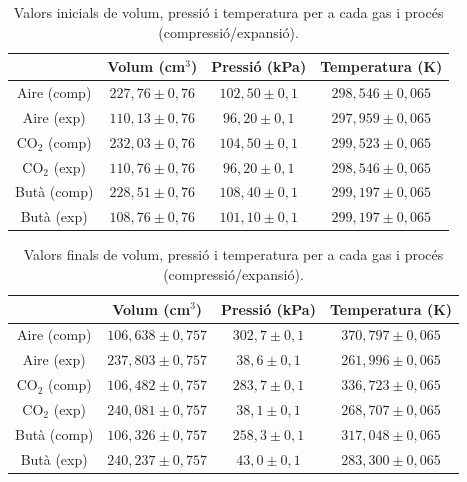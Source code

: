 \documentclass[a4paper,twoside,12pt]{article}
\theoremstyle{definition}
\begin{document}
	 \begin{table}[h]
	 	\centering
	 	\caption{Valors inicials de volum, pressió i temperatura per a cada gas i procés (compressió/expansió).}

	 	\begin{tabular}{|c|ccc|}
	 		\hline
	 		& Volum (cm$^3$) & Pressió (kPa) & Temperatura (K) \\
	 		\hline
	 		Aire (comp) & $227,76 \pm 0,76$ & $102,50 \pm 0,1$ & $298,546 \pm 0,065$ \\
	 		Aire (exp)  & $110,13 \pm 0,76$ & $96,20 \pm 0,1$  & $297,959 \pm 0,065$ \\
	 		\hline
	 		CO$_2$ (comp) & $232,03 \pm 0,76$ & $104,50 \pm 0,1$ & $299,523 \pm 0,065$ \\
	 		CO$_2$ (exp)  & $110,76 \pm 0,76$ & $96,20 \pm 0,1$  & $298,546 \pm 0,065$ \\
	 		\hline
	 		Butà (comp) & $228,51 \pm 0,76$ & $108,40 \pm 0,1$ & $299,197 \pm 0,065$ \\
	 		Butà (exp)  & $108,76 \pm 0,76$ & $101,10 \pm 0,1$ & $299,197 \pm 0,065$ \\
	 		\hline
	 	\end{tabular}
	 	\label{tab:ini_VPT}
	 \end{table}
	 
	 \begin{table}[h]
	 	\centering
	 	\caption{Valors finals de volum, pressió i temperatura per a cada gas i procés (compressió/expansió).}
	
	 	\begin{tabular}{|c|ccc|}
	 		\hline
	 		& Volum (cm$^3$) & Pressió (kPa) & Temperatura (K) \\
	 		\hline
	 		Aire (comp) & $106,638 \pm 0,757$ & $302,7 \pm 0,1$ & $370,797 \pm 0,065$ \\
	 		Aire (exp)  & $237,803 \pm 0,757$ & $38,6 \pm 0,1$  & $261,996 \pm 0,065$ \\
	 		\hline
	 		CO$_2$ (comp) & $106,482 \pm 0,757$ & $283,7 \pm 0,1$ & $336,723 \pm 0,065$ \\
	 		CO$_2$ (exp)  & $240,081 \pm 0,757$ & $38,1 \pm 0,1$  & $268,707 \pm 0,065$ \\
	 		\hline
	 		Butà (comp) & $106,326 \pm 0,757$ & $258,3 \pm 0,1$ & $317,048 \pm 0,065$ \\
	 		Butà (exp)  & $240,237 \pm 0,757$ & $43,0 \pm 0,1$  & $283,300 \pm 0,065$ \\
	 		\hline
	 	\end{tabular}
	 	 \label{tab:fin_VPT}
	 \end{table}
	 
\end{document}
